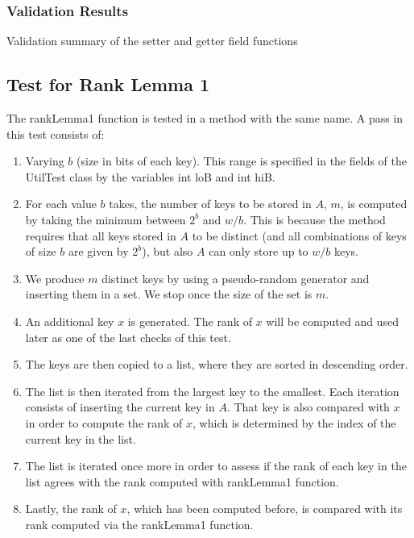 \subsubsection{Validation Results}

\begin{table}[H]
\centering

\caption{Validation summary of the setter and getter field functions}
\label{tab:setGetFieldValidation}
\end{table}

\subsection{Test for Rank Lemma 1}
The {\ttfamily rankLemma1} function is tested in a method with the same name.
A pass in this test consists of:
\begin{enumerate}
    \item
    Varying $b$ (size in bits of each key). This range is specified in the fields of the {\ttfamily UtilTest} class by the variables {\ttfamily int loB} and {\ttfamily int hiB}.
    
    \item
    For each value $b$ takes, the number of keys to be stored in $A$, $m$, is computed by taking the minimum between $2^b$ and $w/b$. This is because the method requires that all keys stored in $A$ to be distinct (and all combinations of keys of size $b$ are given by $2^b$), but also $A$ can only store up to $w/b$ keys.
    
    \item
    We produce $m$ distinct keys by using a pseudo-random generator and inserting them in a set. We stop once the size of the set is $m$.
    
    \item
    An additional key $x$ is generated. The rank of $x$ will be computed and used later as one of the last checks of this test.
    
    \item
    The keys are then copied to a list, where they are sorted in descending order.
    
    \item
    The list is then iterated from the largest key to the smallest. Each iteration consists of inserting the current key in $A$. That key is also compared with $x$ in order to compute the rank of $x$, which is determined by the index of the current key in the list.
    
    \item
    The list is iterated once more in order to assess if the rank of each key in the list agrees with the rank computed with {\ttfamily rankLemma1} function.
    
    \item
    Lastly, the rank of $x$, which has been computed before, is compared with its rank computed via the {\ttfamily rankLemma1} function.
\end{enumerate}

